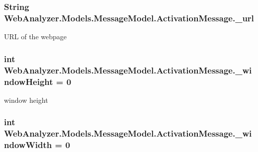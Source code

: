 \subsubsection[{\+\_\+url}]{\setlength{\rightskip}{0pt plus 5cm}String Web\+Analyzer.\+Models.\+Message\+Model.\+Activation\+Message.\+\_\+url\hspace{0.3cm}{\ttfamily [private]}}\label{class_web_analyzer_1_1_models_1_1_message_model_1_1_activation_message_a7d5933c3187edc115317483ad31df6b4}


U\+R\+L of the webpage 

\hypertarget{class_web_analyzer_1_1_models_1_1_message_model_1_1_activation_message_a2c2e9dc30927ed3ee522d3a18dd4832d}{}
\subsubsection[{\+\_\+window\+Height}]{\setlength{\rightskip}{0pt plus 5cm}int Web\+Analyzer.\+Models.\+Message\+Model.\+Activation\+Message.\+\_\+window\+Height = 0\hspace{0.3cm}{\ttfamily [private]}}\label{class_web_analyzer_1_1_models_1_1_message_model_1_1_activation_message_a2c2e9dc30927ed3ee522d3a18dd4832d}


window height 

\hypertarget{class_web_analyzer_1_1_models_1_1_message_model_1_1_activation_message_a57c56a4024223834bf60bc90bce66327}{}
\subsubsection[{\+\_\+window\+Width}]{\setlength{\rightskip}{0pt plus 5cm}int Web\+Analyzer.\+Models.\+Message\+Model.\+Activation\+Message.\+\_\+window\+Width = 0\hspace{0.3cm}{\ttfamily [private]}}\label{class_web_analyzer_1_1_models_1_1_message_model_1_1_activation_message_a57c56a4024223834bf60bc90bce66327}


